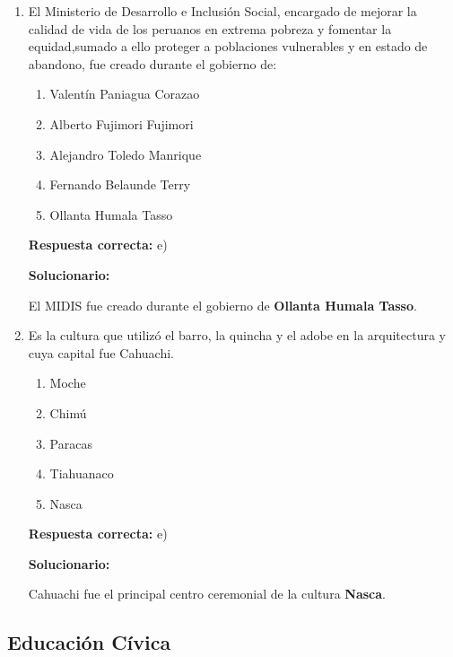 \begin{enumerate}[resume]
	
	\item El Ministerio de Desarrollo e Inclusión Social, encargado de mejorar la calidad de vida de los peruanos en extrema pobreza y fomentar la equidad,sumado a ello proteger a poblaciones vulnerables y en estado de abandono, fue creado durante el gobierno de:
	\begin{enumerate}[label=\alph*)]
		\item Valentín Paniagua Corazao
		\item Alberto Fujimori Fujimori
		\item Alejandro Toledo Manrique
		\item Fernando Belaunde Terry
		\item Ollanta Humala Tasso
	\end{enumerate}
	\textbf{Respuesta correcta:} e)
	
	\vspace{2mm}
	\textbf{Solucionario:}
	
	El MIDIS fue creado durante el gobierno de \textbf{Ollanta Humala Tasso}.
	
	\vspace{6mm}
	
	\item Es la cultura que utilizó el barro, la quincha y el adobe en la arquitectura y cuya capital fue Cahuachi.
	\begin{enumerate}[label=\alph*)]
		\item Moche
		\item Chimú
		\item Paracas
		\item Tiahuanaco
		\item Nasca
	\end{enumerate}
	\textbf{Respuesta correcta:} e)
	
	\vspace{2mm}
	\textbf{Solucionario:}
	
	Cahuachi fue el principal centro ceremonial de la cultura \textbf{Nasca}.
	
	\vspace{6mm}
	
\end{enumerate}

\subsection*{Educación Cívica}

